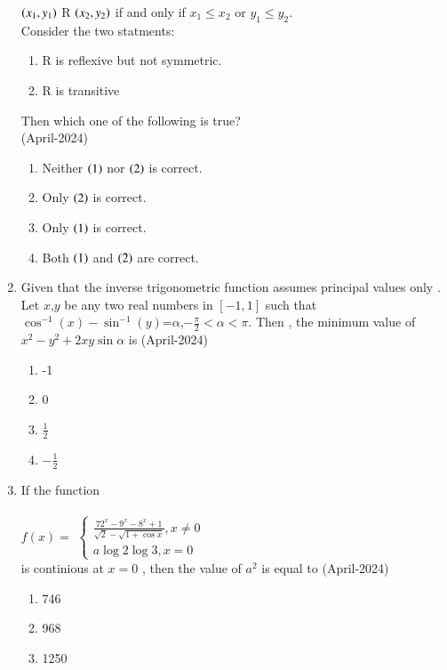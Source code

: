 \documentclass[journal,12pt,onecolumn]{IEEEtran}
\theoremstyle{remark}
\begin{document}
\begin{enumerate}
$\left(x_1,y_1\right)$ R $\left(x_2,y_2\right)$ if and only if $x_1\leq x_2$ or $y_1\leq y_2$.\\
Consider the two statments:
\begin{enumerate}
\item R is reflexive but not symmetric.
\item R is transitive
\end{enumerate}
Then which one of the following is true?\\
\hfill{(April-2024)}
\begin{multicols}{2}
\begin{enumerate}
\item Neither $\left(1\right)$ nor $\left(2\right)$ is correct. 
\item Only $\left(2\right)$ is correct.
\item Only $\left(1\right)$ is correct. 
\item Both $\left(1\right)$ and $\left(2\right)$ are correct.
\end{enumerate}
\end{multicols}
\item Given that the inverse trigonometric function assumes principal values only . Let $x$,$y$ be any two real numbers in $[-1,1]$ such that  $\cos^{-1}(x)-\sin^{-1}(y)$=$\alpha $,$-\frac{\pi}{2}<\alpha<\pi$.
Then , the minimum value of $x^2-y^2+2xy\sin{\alpha}$ is 
\hfill{(April-2024)}
\begin{multicols}{2}
\begin{enumerate}
\item -1
\item 0
\item $\frac{1}{2}$
\item $-\frac{1}{2}$
\end{enumerate}
\end{multicols}
\item If the function\\
\\$f(x)=$
$ \begin{cases}
   \frac{72^x-9^x-8^x+1}{\sqrt{2}-\sqrt{1+\cos{x}}},x \neq 0\\
   a\log2\log3,x=0
\end{cases} $ \\
is continious at $x=0$ , then the value of $a^2$ is equal to 
\hfill{(April-2024)}
\begin{multicols}{2}
\begin{enumerate}
\item 746
\item 968 
\item 1250

\end{enumerate}
\end{multicols}
\end{enumerate}
\end{document}
